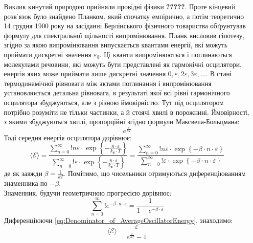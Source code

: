 \documentclass{article}
\begin{document}
\Task{}Виклик кинутий природою прийняли провідні фізики \textbf{?????}. Проте кінцевий розв’язок було знайдено Планком, який спочатку емпірично, а потім теоретично 14 грудня 1900 року на засіданні Берлінського фізичного 
товариства обґрунтував формулу для спектральної щільності випромінювання. Планк висловив гіпотезу, згідно за якою випромінювання випускається квантами енергії, які можуть приймати дискретні значення $\varepsilon_{0}$. Ці кванти 
випромінюються і поглинаються молекулами речовини, які можуть бути представлені як гармонічні осцилятори, енергія яких може приймати лише дискретні значення $0, \varepsilon, 2\varepsilon, 3\varepsilon, \dots$. В стані 
термодинамічної рівноваги між актами поглинання і випромінювання установлюється детальна рівновага, в результаті якої всі рівні гармонічного осцилятора збуджуються, але з різною ймовірністю. Тут під осцилятором потрібно 
розуміти не тільки частинки, а й стоячі хвилі в порожнині. Ймовірності, з якими збуджуються хвилі, пропорційні згідно формули Максвела-Больцмана: 
\begin{equation}
    \label{eq:Maxwell-BoltzmannFormula}
    e^{\frac{\varepsilon}{k T}}
\end{equation}
Тоді середня енергія осцилятора дорівнює:
\begin{equation}
    \label{eq:AverageOscillatorEnergy}
    \langle \mathcal{E} \rangle = \frac{\sum\limits_{n=0}^{\infty}!n \varepsilon \cdot \exp\left\{-\tfrac{n \cdot \varepsilon}{k_{\text{Б}} \cdot T}\right\}}{\sum\limits_{n=0}^{\infty}! \varepsilon \cdot \exp\left\{-\tfrac{n \cdot \varepsilon}{k_{\text{Б}} \cdot T}\right\}} =
    \frac{\sum\limits_{n=0}^{\infty}!n \varepsilon \cdot \exp\left\{-\beta \cdot n \cdot \varepsilon\right\}}{\sum\limits_{n=0}^{\infty}!\varepsilon \cdot \exp\left\{-\beta \cdot n \cdot \varepsilon\right\}}
\end{equation}
де як завжди $\beta = \tfrac{1}{kT}$. Помітимо, що чисельники отримуються диференціюванням знаменника по $-\beta$. \vspace{5mm} \\
Знаменник, будучи геометричною прогресією дорівнює:
\begin{equation}
    \label{eq:Denominator_of_AverageOscillatorEnergy}
    \sum\limits_{n=0}^{\infty} ! e^{-\beta \cdot n \cdot \varepsilon} = \frac{1}{1 - e^{-\beta \cdot \varepsilon}}
\end{equation}
Диференціюючи \eqref{eq:Denominator_of_AverageOscillatorEnergy}, знаходимо:
\begin{equation}
    \label{eq:AverageOscillatorEnergyValue}
    \langle \mathcal{E} \rangle = \frac{\varepsilon}{e^\tfrac{\varepsilon}{kT} - 1}
\end{equation}
\end{document}

